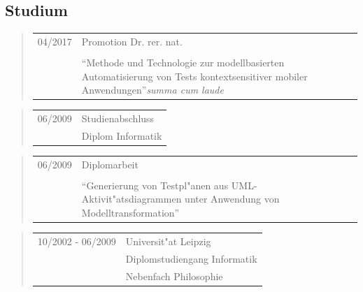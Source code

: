 \subsection*{Studium} 
\begin{quote}
	\begin{tabular}{p{4cm}l}
		04/2017&Promotion Dr. rer. nat.\\\\
		&\begin{minipage}{8cm}"`Methode und Technologie zur modellbasierten Automatisierung von Tests kontextsensitiver mobiler Anwendungen"'\newline \emph{summa cum laude}
		\end{minipage}
	\end{tabular}
\end{quote}
\begin{quote}
	\begin{tabular}{p{4cm}l}
		06/2009&Studienabschluss\\ 
		&Diplom Informatik
	\end{tabular}
\end{quote}
\begin{quote}
	\begin{tabular}{p{4cm}l}
		06/2009&Diplomarbeit\\\\
		&\begin{minipage}{8cm}"`Generierung von Testpl"anen aus
		UML-Aktivit"atsdiagrammen unter Anwendung von Modelltransformation"'
		\end{minipage}
	\end{tabular}
\end{quote}
\begin{quote}
	\begin{tabular}{p{4cm}l}
		10/2002 - 06/2009&Universit"at Leipzig\\
		&Diplomstudiengang Informatik\\
		&Nebenfach Philosophie
	\end{tabular}
\end{quote}